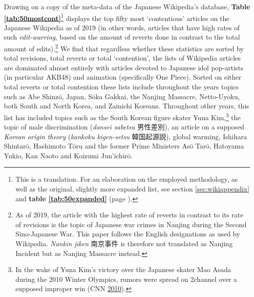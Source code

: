 \documentclass[10pt,british,A4paper,oneside]{memoir}
\begin{document}
Drawing on a copy of the meta-data of the Japanese Wikipedia's database,
\textbf{Table \ref{tab:50mostcont}}\footnote{This is a translation. For
  an elaboration on the employed methodology, as well as the original,
  slightly more expanded list, see section \ref{sec:wikiappendix} and
  \textbf{table \ref{tab:50expanded}} (page \pageref{tab:50expanded}).}
displays the top fifty most `contentious' articles on the Japanese
Wikipedia as of 2019 (in other words, articles that have high rates of
such \emph{edit-warring}, based on the amount of reverts done in
contrast to the total amount of edits).\footnote{As of 2019, the article
  with the highest rate of reverts in contrast to its rate of revisions
  is the topic of Japanese war crimes in Nanjing during the Second
  Sino-Japanese War. This paper follows the English designations as used
  by Wikipedia. \emph{Nankin jiken} 南京事件 is therefore not translated
  as Nanjing Incident but as Nanjing Massacre instead.} We find that regardless whether these statistics are sorted by
total revisions, total reverts or total `contention', the lists of
Wikipedia articles are dominated almost entirely with articles devoted
to Japanese idol pop-artists (in particular AKB48) and animation
(specifically One Piece). Sorted on either total reverts or total
contention these lists include throughout the years topics such as Abe
Shinzō, Japan, Sōka Gakkai, the Nanjing Massacre, Netto-Uyoku, both
South and North Korea, and Zainichi Koreans. Throughout other years,
this list has included topics such as the South Korean figure skater
Yuna Kim,\footnote{In the wake of Yuna Kim's victory over the Japanese
  skater Mao Asada during the 2010 Winter Olympics, rumors were spread
  on 2channel over a supposed improper win (CNN
  \protect\hyperlink{ref-cnn_korean_2010}{2010}).} the topic of male
discrimination (\emph{dansei sabetsu} 男性差別), an article on a
supposed \emph{Korean origin theory} (\emph{kankoku kigen-setsu}
韓国起源説), global warming, Ishihara Shintarō, Hashimoto Tōru and the
former Prime Ministers Asō Tarō, Hatoyama Yukio, Kan Naoto and Koizumi
Jun'ichirō.
\end{document}
